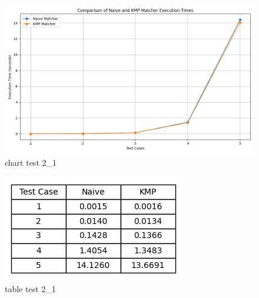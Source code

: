 \documentclass[11pt]{article}
\begin{document}
                \begin{figure}[H]
                    \centering
                    \includegraphics[width = \textwidth]{execution_times_2_1}
                    \caption{chart test 2\_1}
                    \label{fig:chart_test_2_1}
                \end{figure}

                \begin{figure}[H]
                    \centering
                    \includegraphics[width = 0.5 \textwidth]{table_execution_times_2_1}
                    \caption{table test 2\_1}
                    \label{fig:table_test_2_1}
                \end{figure}

                \newpage

\end{document}
